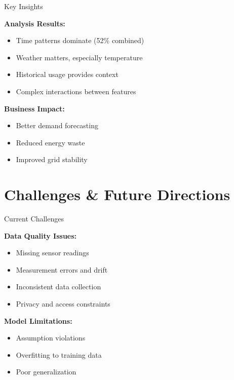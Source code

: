 \documentclass{sustainabilitylab}
\begin{document}
\begin{frame}{Key Insights}

\textbf{Analysis Results:}
\begin{itemize}
  \item Time patterns dominate (52\% combined)
  \item Weather matters, especially temperature
  \item Historical usage provides context
  \item Complex interactions between features
\end{itemize}

\textbf{Business Impact:}
\begin{itemize}
  \item Better demand forecasting
  \item Reduced energy waste
  \item Improved grid stability
\end{itemize}

\end{frame}


\section{Challenges \& Future Directions}

\begin{frame}{Current Challenges}

\textbf{Data Quality Issues:}
\begin{itemize}
  \item Missing sensor readings
  \item Measurement errors and drift
  \item Inconsistent data collection
  \item Privacy and access constraints
\end{itemize}

\textbf{Model Limitations:}
\begin{itemize}
  \item Assumption violations
  \item Overfitting to training data
  \item Poor generalization
\end{itemize}

\end{frame}
\end{document}
